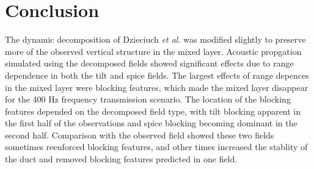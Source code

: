 \documentclass[preprint,NumberedRefs]{JASA}
\begin{document}
\section{Conclusion}\label{sec:conclusion}
The dynamic decomposition of Dzieciuch \emph{et al.} was modified slightly to preserve more of the observed vertical structure in the mixed layer. Acoustic propgation simulated using the decomposed fields showed significant effects due to range dependence in both the tilt and spice fields. The largest effects of range depences in the mixed layer were blocking features, which made the mixed layer disappear for the 400 Hz frequency transmission scenario. The location of the blocking features depended on the decomposed field type, with tilt blocking apparent in the first half of the observations and spice blocking becoming dominant in the second half. Comparison with the observed field showed these two fields sometimes reenforced blocking features, and other times increased the stablity of the duct and removed blocking features predicted in one field.




\end{document}

